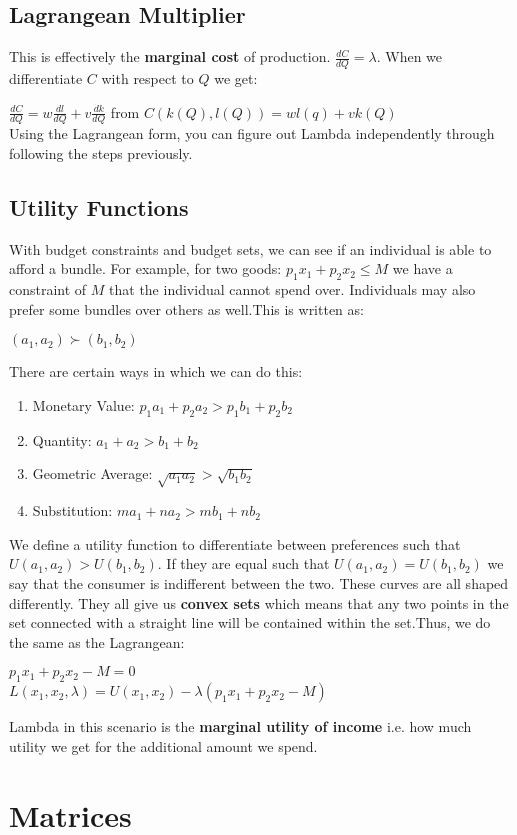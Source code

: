\documentclass[12pt, letterpaper]{article}
\begin{document}
\subsection{Lagrangean Multiplier}
This is effectively the \textbf{marginal cost} of production. $\frac{dC}{dQ} = \lambda$. When we differentiate $C$ with respect to $Q$ we get:
\begin{center}
	$\frac{dC}{dQ}=w\frac{dl}{dQ}+v\frac{dk}{dQ}$ from $C(k(Q),l(Q)) = wl(q) + vk(Q)$\\
	Using the Lagrangean form, you can figure out Lambda independently through following the steps previously.
\end{center}

\subsection{Utility Functions}
With budget constraints and budget sets, we can see if an individual is able to afford a bundle. For example, for two goods: $p_1x_1+p_2x_2 \leq M$ we have a constraint of $M$ that the individual cannot spend over.
Individuals may also prefer some bundles over others as well.This is written as:
\begin{center}
	$(a_1, a_2) \succ (b_1, b_2)$
\end{center}
There are certain ways in which we can do this:
\begin{enumerate}
	\item Monetary Value: $p_1a_1 + p_2a_2 > p_1b_1 + p_2b_2$
	\item Quantity: $a_1 + a_2 > b_1 + b_2$
	\item Geometric Average: $\sqrt{a_1a_2} > \sqrt{b_1b_2}$
	\item Substitution: $ma_1 +na_2 > mb_1 + nb_2$
\end{enumerate}
We define a utility function to differentiate between preferences such that $U(a_1, a_2) > U(b_1, b_2)$. If they are equal such that $U(a_1, a_2) = U(b_1, b_2)$ we say that the consumer is indifferent between the two. These curves are all shaped differently. They all give us \textbf{convex sets} which means that any two points in the set connected with a straight line will be contained within the set.Thus, we do the same as the Lagrangean:
\begin{center}
	$p_1x_1+p_2x_2-M=0$\\
	$L(x_1, x_2, \lambda) = U(x_1, x_2) - \lambda(p_1x_1+p_2x_2-M)$
\end{center}
Lambda in this scenario is the \textbf{marginal utility of income} i.e. how much utility we get for the additional amount we spend.

\section{Matrices}
\end{document}
